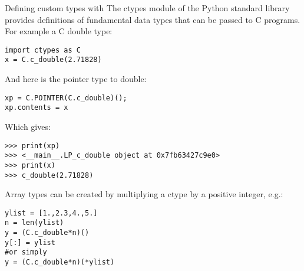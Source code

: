 \documentclass[10pt, t]{beamer}
\let\texttt=\graytt
\begin{document}



\begin{frame}[fragile,label=sec-3-5]{Defining custom types with \texttt{ctypes}}
The ctypes module of the Python standard library provides definitions of fundamental data types that can be passed to C programs. For example a C double type:
\lstset{language=Python,label= ,caption= ,numbers=none}
\begin{lstlisting}
import ctypes as C
x = C.c_double(2.71828)
\end{lstlisting}
\pause
And here is the pointer type to double:
\lstset{language=Python,label= ,caption= ,numbers=none}
\begin{lstlisting}
xp = C.POINTER(C.c_double)(); 
xp.contents = x
\end{lstlisting}

\pause
Which gives:
\lstset{language=Python,label= ,caption= ,numbers=none}
\begin{lstlisting}
>>> print(xp)
>>> <__main__.LP_c_double object at 0x7fb63427c9e0>
>>> print(x)
>>> c_double(2.71828)
\end{lstlisting}

\pause
Array types can be created by multiplying a ctype by a positive integer, e.g.:
\lstset{language=Python,label= ,caption= ,numbers=none}
\begin{lstlisting}
ylist = [1.,2.3,4.,5.]
n = len(ylist)
y = (C.c_double*n)()
y[:] = ylist
#or simply
y = (C.c_double*n)(*ylist)
\end{lstlisting}
\end{frame}
\end{document}
